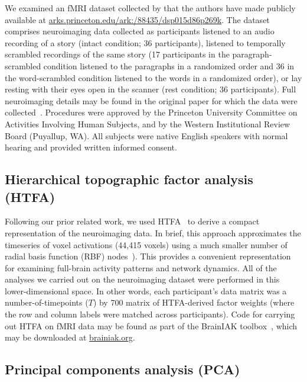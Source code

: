 \documentclass[english, 11pt]{article}
\begin{document}
We examined an fMRI dataset collected by \cite{SimoEtal16} that the authors
have made publicly available at
\href{http://arks.princeton.edu/ark:/88435/dsp015d86p269k}{arks.princeton.edu/ark:/88435/dsp015d86p269k}.
The dataset comprises neuroimaging data collected as participants listened to
an audio recording of a story (intact condition; 36 participants), listened to
temporally scrambled recordings of the same story (17 participants in the
paragraph-scrambled condition listened to the paragraphs in a randomized order
and 36 in the word-scrambled condition listened to the words in a randomized
order), or lay resting with their eyes open in the scanner (rest condition; 36
participants). Full neuroimaging details may be found in the original paper for
which the data were collected~\citep{SimoEtal16}. Procedures were approved by
the Princeton University Committee on Activities Involving Human Subjects, and
by the Western Institutional Review Board (Puyallup, WA). All subjects were
native English speakers with normal hearing and provided written informed
consent.

\subsection*{Hierarchical topographic factor analysis (HTFA)}

Following our prior related work, we used HTFA~\citep{MannEtal18} to derive a
compact representation of the neuroimaging data. In brief, this approach
approximates the timeseries of voxel activations (44,415 voxels) using a much
smaller number of radial basis function (RBF) nodes~\citep[in this case, 700
nodes, as determined by an optimization procedure;][]{MannEtal18}). This
provides a convenient representation for examining full-brain activity patterns
and network dynamics. All of the analyses we carried out on the neuroimaging
dataset were performed in this lower-dimensional space. In other words, each
participant's data matrix was a number-of-timepoints ($T$) by 700 matrix of
HTFA-derived factor weights (where the row and column labels were matched
across participants). Code for carrying out HTFA on fMRI data may be found as
part of the BrainIAK toolbox~\citep{CapoEtal17, KumaEtal21}, which may be
downloaded at \href{https://brainiak.org/}{brainiak.org}.

\subsection*{Principal components analysis (PCA)}
\end{document}
